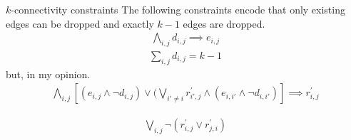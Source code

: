 \documentclass{beamer}
\theoremstyle{definition}
\theoremstyle{remark}
\begin{document}
 \begin{frame}[label=math]{$k$-connectivity constraints}
    The following constraints encode that only
existing edges can be dropped and exactly $k-1$ edges are dropped.
     \begin{equation}
\begin{alignedat}{2}
\ \bigwedge\limits_{i,j} d_{i,j} \implies e_{i,j}\\
  \sum_{i,j} d_{i,j} = k-1
\end{alignedat}
\end{equation}
but, in my opinion.
\begin{equation}
\begin{alignedat}{2}
\bigwedge\limits_{i,j}  [(e_{i,j} \land  \neg d_{i,j}) \lor  (\bigvee_{i' \neq i}  r^{\prime}_{i',j} \land  (e_{i,i'} \land \neg d_{i,i'}) ] \implies r^{\prime}_{i,j}  
\end{alignedat}
\end{equation}

 \begin{equation}
\begin{alignedat}{2}
 \bigvee\limits_{i,j} \neg (r^{\prime}_{i,j} \lor r^{\prime}_{j,i})
\end{alignedat}
\end{equation}
\end{frame}

\end{document}
